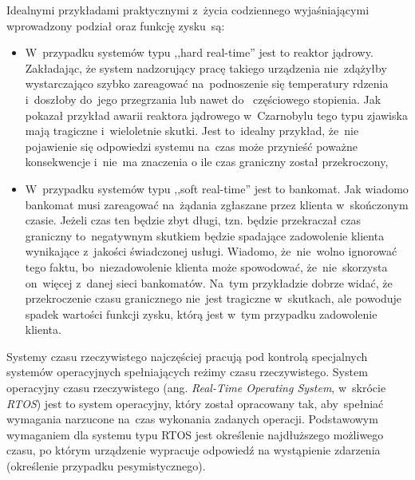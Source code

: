 Idealnymi przykładami praktycznymi z~życia codziennego wyjaśniającymi wprowadzony podział oraz funkcję zysku~są:
\begin{itemize}
\item W~przypadku systemów typu  ,,hard real-time'' jest to reaktor jądrowy. Zakładając, że system nadzorujący pracę takiego urządzenia nie~zdążyłby wystarczająco szybko zareagować na~podnoszenie się temperatury rdzenia i~doszłoby do~jego przegrzania lub nawet do~ częściowego stopienia. Jak pokazał przykład awarii reaktora jądrowego w~Czarnobylu tego typu zjawiska mają tragiczne i~wieloletnie skutki. Jest to~idealny przykład, że~nie pojawienie się odpowiedzi systemu na~czas może przynieść poważne konsekwencje i~nie~ma znaczenia o ile czas graniczny został przekroczony,
\item W~przypadku systemów typu  ,,soft real-time'' jest to bankomat. Jak wiadomo bankomat musi zareagować na~żądania zgłaszane przez klienta w~skończonym czasie. Jeżeli czas ten będzie zbyt długi, tzn. będzie przekraczał czas graniczny to~negatywnym skutkiem będzie spadające zadowolenie klienta wynikające z~jakości świadczonej usługi. Wiadomo, że~nie~wolno ignorować tego faktu, bo~niezadowolenie klienta może spowodować, że~nie~skorzysta on~więcej z~danej sieci bankomatów. Na~tym przykładzie dobrze widać, że przekroczenie czasu granicznego nie~jest tragiczne w~skutkach, ale powoduje spadek wartości funkcji zysku, którą jest w~tym przypadku zadowolenie klienta.
\end{itemize}

Systemy czasu rzeczywistego najczęściej pracują pod kontrolą specjalnych systemów operacyjnych spełniających reżimy czasu rzeczywistego. System operacyjny czasu rzeczywistego (ang. \textit{Real-Time Operating System}, w~skrócie \textit{RTOS}) jest to system operacyjny, który został opracowany tak, aby~spełniać wymagania narzucone na~czas wykonania zadanych operacji. Podstawowym wymaganiem dla systemu typu RTOS jest określenie najdłuższego możliwego czasu, po którym urządzenie wypracuje odpowiedź na wystąpienie zdarzenia (określenie przypadku pesymistycznego). 

